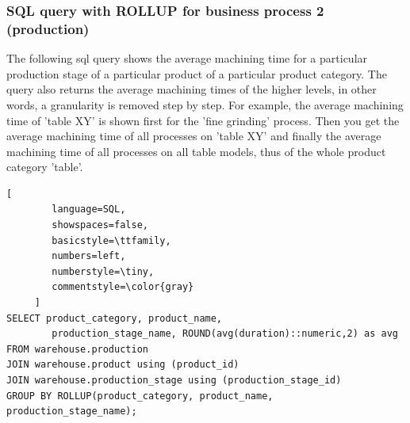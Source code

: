\documentclass[letterpaper,12pt]{article}
\begin{document}
\subsubsection{SQL query with ROLLUP for business process 2 (production)}

The following sql query shows the average machining time for a particular production stage of a particular product of a particular product category. The query also returns the average machining times of the higher levels, in other words, a granularity is removed step by step. For example, the average machining time of 'table XY' is shown first for the 'fine grinding' process. Then you get the average machining time of all processes on 'table XY' and finally the average machining time of all processes on all table models, thus of the whole product category 'table'.

\begin{lstlisting}[
        language=SQL,
        showspaces=false,
        basicstyle=\ttfamily,
        numbers=left,
        numberstyle=\tiny,
        commentstyle=\color{gray}
     ]
SELECT product_category, product_name, 
        production_stage_name, ROUND(avg(duration)::numeric,2) as avg
FROM warehouse.production
JOIN warehouse.product using (product_id)
JOIN warehouse.production_stage using (production_stage_id)
GROUP BY ROLLUP(product_category, product_name, production_stage_name);
\end{lstlisting}    
\end{document}
